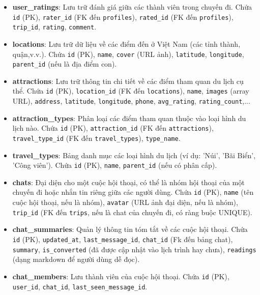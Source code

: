 \begin{itemize}
    \item \textbf{user\_ratings}: Lưu trữ đánh giá giữa các thành viên trong chuyến đi. Chứa \texttt{id} (PK), \texttt{rater\_id} (FK đến \texttt{profiles}), \texttt{rated\_id} (FK đến \texttt{profiles}), \texttt{trip\_id}, \texttt{rating}, \texttt{comment}.

    \item \textbf{locations}: Lưu trữ dữ liệu về các điểm đến ở Việt Nam (các tỉnh thành, quận,v.v.). Chứa \texttt{id} (PK), \texttt{name}, \texttt{cover} (URL ảnh), \texttt{latitude}, \texttt{longitude}, \texttt{parent\_id} (nếu là địa điểm con).

    \item \textbf{attractions}: Lưu trữ thông tin chi tiết về các điểm tham quan du lịch cụ thể. Chứa \texttt{id} (PK), \texttt{location\_id} (FK đến \texttt{locations}), \texttt{name}, \texttt{images} (array URL), \texttt{address}, \texttt{latitude}, \texttt{longitude}, \texttt{phone}, \texttt{avg\_rating}, \texttt{rating\_count},...

    \item \textbf{attraction\_types}: Phân loại các điểm tham quan thuộc vào loại hình du lịch nào. Chứa \texttt{id} (PK), \texttt{attraction\_id} (FK đến \texttt{attractions}), \texttt{travel\_type\_id} (FK đến \texttt{travel\_types}), \texttt{type\_name}.

    \item \textbf{travel\_types}: Bảng danh mục các loại hình du lịch (ví dụ: 'Núi', 'Bãi Biển', 'Công viên'). Chứa \texttt{id} (PK), \texttt{name}, \texttt{parent\_id} (nếu có phân cấp).

    \item \textbf{chats}: Đại diện cho một cuộc hội thoại, có thể là nhóm hội thoại của một chuyến đi hoặc nhắn tin riêng giữa các người dùng. Chứa \texttt{id} (PK), \texttt{name} (tên cuộc hội thoại, nếu là nhóm), \texttt{avatar} (URL ảnh đại diện, nếu là nhóm), \texttt{trip\_id} (FK đến \texttt{trips}, nếu là chat của chuyến đi, có ràng buộc UNIQUE).
    
    \item \textbf{chat\_summaries}: Quản lý thông tin tóm tắt về các cuộc hội thoại. Chứa \texttt{id} (PK), \texttt{updated\_at}, \texttt{last\_message\_id}, \texttt{chat\_id} (Fk đến bảng chat), \texttt{summary}, \texttt{is\_converted} (đã được cập nhật vào lịch trình hay chưa), \texttt{readings} (dạng markdown để người dùng dễ đọc).

    \item \textbf{chat\_members}: Lưu thành viên của cuộc hội thoại. Chứa \texttt{id} (PK), \texttt{user\_id}, \texttt{chat\_id}, \texttt{last\_seen\_message\_id}.


\end{itemize}
